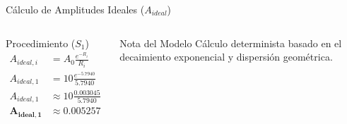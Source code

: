 \begin{frame}{Cálculo de Amplitudes Ideales ($A_{ideal}$)}
\begin{columns}[T]
        \begin{exampleblock}{Procedimiento ($S_1$)}
            \centering
            \footnotesize
            \begin{align*}
                A_{ideal,i} &= A_0 \frac{e^{-R_i}}{R_i} \\[0.1cm]
                A_{ideal,1} &= 10 \frac{e^{-5.7940}}{5.7940} \\[0.1cm]
                A_{ideal,1} &\approx 10 \frac{0.003045}{5.7940} \\[0.1cm]
                \mathbf{A_{ideal,1}} &\approx \mathbf{0.005257}
            \end{align*}
        \end{exampleblock}

        \vspace{0.1cm} %

        \begin{block}{Nota del Modelo}
            \scriptsize
            Cálculo determinista basado en el decaimiento exponencial y dispersión geométrica.
        \end{block}
    \end{columns}

\end{frame}